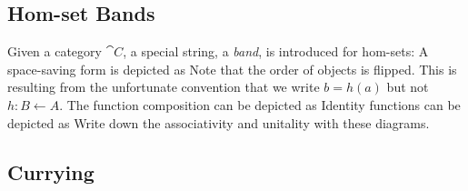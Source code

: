 \subsection{Hom-set Bands}

Given a category $\cat{C}$, a special string, a \textit{band}, is introduced for hom-sets:
A space-saving form is depicted as
Note that the order of objects is flipped. %
This is resulting from the unfortunate convention that we write $b = h(a)$ but not $h : B \leftarrow A$.
\mynewline
The function composition can be depicted as
\mynewline
Identity functions can be depicted as
Write down the associativity and unitality with these diagrams. 


\subsection{Currying}

